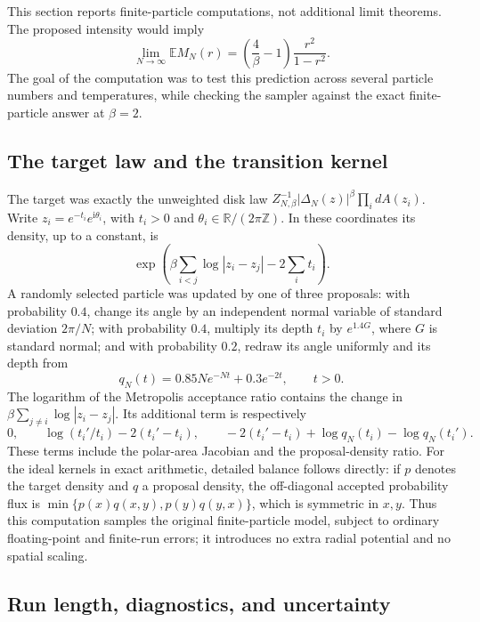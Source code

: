 \documentclass[11pt,a4paper]{article}
\numberwithin{equation}{section}
\theoremstyle{definition}
\theoremstyle{remark}
\begin{document}
This section reports finite-particle computations, not additional limit theorems.
The proposed intensity would imply
\begin{equation}
 \lim_{N\to\infty}\mathbb E M_N(r)
 =\left(\frac4\beta-1\right)\frac{r^2}{1-r^2}.
 \label{eq:numerical-count-prediction}
\end{equation}
The goal of the computation was to test this prediction across several
particle numbers and temperatures, while checking the sampler against the
exact finite-particle answer at $\beta=2$.

\subsection{The target law and the transition kernel}

The target was exactly the unweighted disk law
$Z_{N,\beta}^{-1}|\Delta_N(z)|^\beta\prod_i dA(z_i)$.
Write $z_i=e^{-t_i}e^{\mathrm i\theta_i}$, with $t_i>0$ and
$\theta_i\in\mathbb R/(2\pi\mathbb Z)$.  In these coordinates its density,
up to a constant, is
\[
 \exp\!\left(\beta\sum_{i<j}\log|z_i-z_j|-2\sum_i t_i\right).
\]
A randomly selected particle was updated by one of three proposals:
with probability $0.4$, change its angle by an independent normal variable
of standard deviation $2\pi/N$; with probability $0.4$, multiply its depth
$t_i$ by $e^{1.4G}$, where $G$ is standard normal; and with probability $0.2$,
redraw its angle uniformly and its depth from
\[
 q_N(t)=0.85N e^{-Nt}+0.3e^{-2t},\qquad t>0.
\]
The logarithm of the Metropolis acceptance ratio contains the change in
$\beta\sum_{j\ne i}\log|z_i-z_j|$.  Its additional term is respectively
\[
 0,\qquad
 \log(t_i'/t_i)-2(t_i'-t_i),\qquad
 -2(t_i'-t_i)+\log q_N(t_i)-\log q_N(t_i').
\]
These terms include the polar-area Jacobian and the proposal-density ratio.
For the ideal kernels in exact arithmetic, detailed balance follows directly:
if $p$ denotes the target density and $q$ a proposal density, the off-diagonal
accepted probability flux is
$\min\{p(x)q(x,y),p(y)q(y,x)\}$, which is symmetric in $x,y$.
Thus this computation samples the original finite-particle model, subject to
ordinary floating-point and finite-run errors; it introduces no extra radial
potential and no spatial scaling.

\subsection{Run length, diagnostics, and uncertainty}
\end{document}
